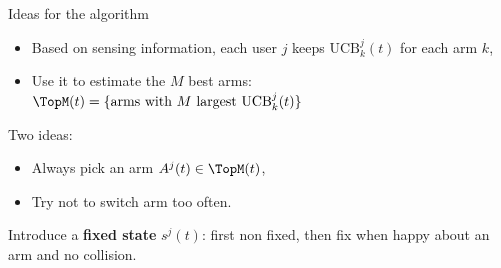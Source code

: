 \documentclass[12pt,english,ignorenonframetext,]{beamer}
\providecommand{\tightlist}{%
  \setlength{\itemsep}{0pt}\setlength{\parskip}{0pt}}
\begin{document}
\begin{frame}{Ideas for the \MCTopM{} algorithm}

\begin{itemize}\tightlist
\item
  Based on sensing information, each user \(j\) keeps \(\mathrm{UCB}_k^j(t)\) for each arm \(k\),
\item
  Use it to estimate the \(M\) best arms: \(\TopM(t) = \{\text{arms with } M \text{ largest } \mathrm{UCB}_k^j(t)\}\)
\end{itemize}

Two ideas:
\begin{itemize}\tightlist
  \item
  Always pick an arm \(A^j(t) \in \TopM(t)\),
  \item
  Try not to switch arm too often.
\end{itemize}

Introduce a \textbf{fixed state} \(s^j(t)\):
\newline
first non fixed, then fix when happy about an arm and no collision.

\end{frame}
\end{document}
